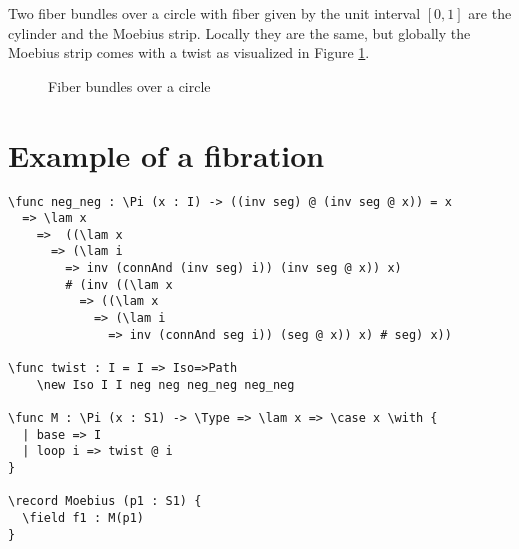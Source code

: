 Two fiber bundles over a circle  with fiber given by the unit interval $[0,1]$ are the cylinder and the Moebius strip. Locally they are the same, but globally the Moebius strip comes with a twist as visualized in Figure \ref{fig:1}.
\begin{figure}[H]
\centering
{}
\caption{Fiber bundles over a circle} \label{fig:1}
\end{figure}

\section{Example of a fibration}

\begin{ListingEnv}[H]
\begin{lstlisting}
\func neg_neg : \Pi (x : I) -> ((inv seg) @ (inv seg @ x)) = x 
  => \lam x 
    =>  ((\lam x 
      => (\lam i 
        => inv (connAnd (inv seg) i)) (inv seg @ x)) x)
        # (inv ((\lam x 
          => ((\lam x 
            => (\lam i 
              => inv (connAnd seg i)) (seg @ x)) x) # seg) x))

\func twist : I = I => Iso=>Path
    \new Iso I I neg neg neg_neg neg_neg

\func M : \Pi (x : S1) -> \Type => \lam x => \case x \with {
  | base => I
  | loop i => twist @ i
}

\record Moebius (p1 : S1) {
  \field f1 : M(p1)
}
\end{lstlisting}
\end{ListingEnv}

